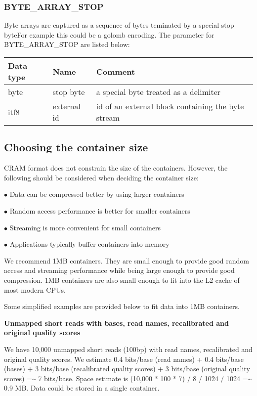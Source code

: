 \documentclass[a4paper]{article}
\begin{document}
\subsubsection*{BYTE\_ARRAY\_STOP }

Byte arrays are captured as a sequence of bytes teminated by a special stop byteFor 
example this could be a golomb encoding. The parameter for BYTE\_ARRAY\_STOP are 
listed below:

\begin{tabular}{|>{\raggedright}p{100pt}|>{\raggedright}p{100pt}|>{\raggedright}p{230pt}|}
\hline
\textbf{Data type} & \textbf{Name} & \textbf{Comment}
\tabularnewline
\hline
byte & stop byte & a special byte treated as a delimiter\tabularnewline
\hline
itf8 & external id & id of an external block containing the byte stream\tabularnewline
\hline
\end{tabular}

\subsection{\textbf{Choosing the container size}}

CRAM format does not constrain the size of the containers. However, the following 
should be considered when deciding the container size:

$\bullet$ Data can be compressed better by using larger containers

$\bullet$ Random access performance is better for smaller containers 

$\bullet$ Streaming is more convenient for small containers

$\bullet$ Applications typically buffer containers into memory

We recommend 1MB containers. They are small enough to provide good random access 
and streaming performance while being large enough to provide good compression. 
1MB containers are also small enough to fit into the L2 cache of most modern CPUs.

Some simplified examples are provided below to fit data into 1MB containers.

\textbf{Unmapped short reads with bases, read names, recalibrated and original 
quality scores}

We have 10,000 unmapped short reads (100bp) with read names, recalibrated and original 
quality scores. We estimate 0.4 bits/base (read names) + 0.4 bits/base (bases) 
+ 3 bits/base (recalibrated quality scores) + 3 bits/base (original quality scores) 
=\textasciitilde{} 7 bits/base. Space estimate is (10,000 * 100 * 7) / 8 / 1024 
/ 1024 =\textasciitilde{} 0.9 MB. Data could be stored in a single container.
\end{document}
